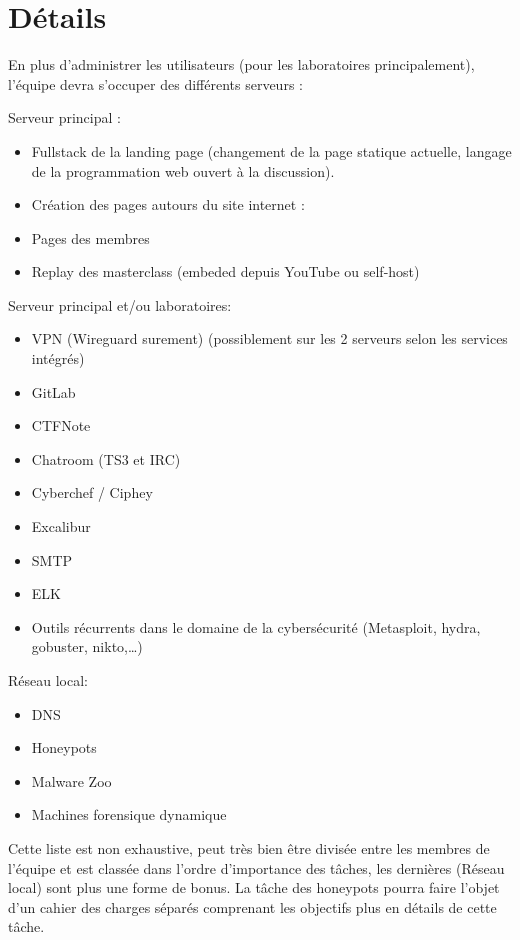 \documentclass[12pt]{article}
\begin{document}
    \section{Détails}
    En plus d’administrer les utilisateurs (pour les laboratoires principalement), l’équipe devra s’occuper des différents serveurs :

\noindent Serveur principal :
\begin{itemize}
    \item{Fullstack de la landing page (changement de la page statique actuelle, langage de la programmation web ouvert à la discussion).}
    \item{Création des pages autours du site internet :}
    \item{Pages des membres}
    \item{Replay des masterclass (embeded depuis YouTube ou self-host)}
\end{itemize}

\noindent Serveur principal et/ou laboratoires:

\begin{itemize}
    \item{VPN (Wireguard surement) (possiblement sur les 2 serveurs selon les services intégrés)}
    \item{GitLab}
    \item{CTFNote}
    \item{Chatroom (TS3 et IRC)}
    \item{Cyberchef / Ciphey}
    \item{Excalibur}
    \item{SMTP}
    \item{ELK}
    \item{Outils récurrents dans le domaine de la cybersécurité (Metasploit, hydra, gobuster, nikto,…)}
\end{itemize}

\noindent Réseau local:

\begin{itemize}
    \item{DNS}
    \item{Honeypots}
    \item{Malware Zoo}
    \item{Machines forensique dynamique}
\end{itemize}

\noindent Cette liste est non exhaustive, peut très bien être divisée entre les membres de l’équipe et est classée dans l’ordre d’importance des tâches, les dernières (Réseau local) sont plus une forme de bonus. La tâche des honeypots pourra faire l’objet d’un cahier des charges séparés comprenant les objectifs plus en détails de cette tâche.
\end{document}
